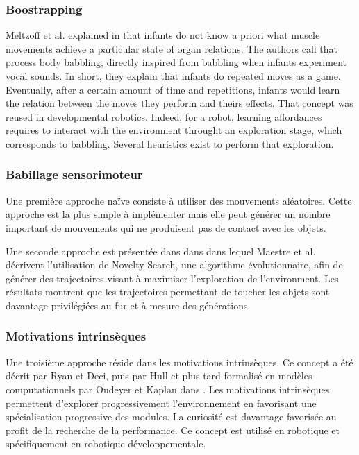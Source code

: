 \documentclass{llncs}
\begin{document}
\subsubsection{Boostrapping}
Meltzoff et al. explained in \cite{EDP:EDP157} that infants do not know a priori what muscle movements achieve a particular state of organ relations. The authors call that process body babbling, directly inspired from babbling when infants experiment vocal sounds. In short, they explain that infants do repeated moves as a game. Eventually, after a certain amount of time and repetitions, infants would learn the relation between the moves they perform and theirs effects. That concept was reused in developmental robotics. Indeed, for a robot, learning affordances requires to interact with the environment throught an exploration stage, which corresponds to babbling. Several heuristics exist to perform that exploration.




\subsubsection{Babillage sensorimoteur}
Une première approche naïve consiste à utiliser des mouvements aléatoires. Cette approche est la plus simple à implémenter mais elle peut générer un nombre important de mouvements qui ne produisent pas de contact avec les objets.

Une seconde approche est présentée dans dans \cite{Maestre2015} dans lequel Maestre et al. décrivent l'utilisation de Novelty Search, une algorithme évolutionnaire, afin de générer des trajectoires visant à maximiser l'exploration de l'environment. Les résultats montrent que les trajectoires permettant de toucher les objets sont davantage privilégiées au fur et à mesure des générations.




\subsubsection{Motivations intrinsèques}
Une troisième approche réside dans les motivations intrinsèques. Ce concept a été décrit par Ryan et Deci, puis par Hull et plus tard formalisé en modèles computationnels par Oudeyer et Kaplan dans \cite{10.3389/neuro.12.006.2007}. Les motivations intrinsèques permettent d'explorer progressivement l'environnement en favorisant une spécialisation progressive des modules. La curiosité est davantage favorisée au profit de la recherche de la performance. Ce concept est utilisé en robotique et spécifiquement en robotique développementale.
\end{document}
